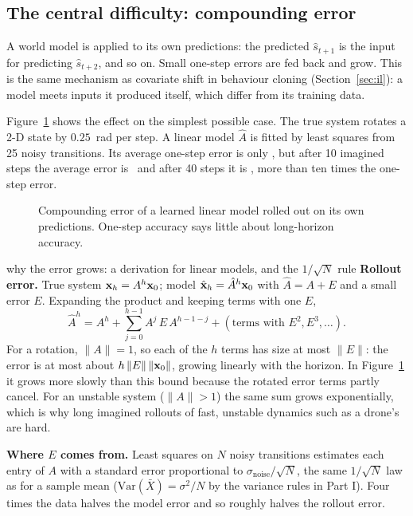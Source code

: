 \subsection{The central difficulty: compounding error}
\label{sec:compound}
A world model is applied to its own predictions: the predicted $\hat s_{t+1}$ is the input for predicting $\hat s_{t+2}$, and so on. Small one-step errors are fed back and grow. This is the same mechanism as covariate shift in behaviour cloning (Section~\ref{sec:il}): a model meets inputs it produced itself, which differ from its training data.

Figure~\ref{fig:compound} shows the effect on the simplest possible case. The true system rotates a 2-D state by $0.25$~rad per step. A linear model $\hat A$ is fitted by least squares from 25 noisy transitions. Its average one-step error is only \onestep, but after 10 imagined steps the average error is \errten\ and after 40 steps it is \errforty, more than ten times the one-step error.

\begin{figure}[h]
\centering
{}
\caption{Compounding error of a learned linear model rolled out on its own predictions. One-step accuracy says little about long-horizon accuracy.}
\label{fig:compound}
\end{figure}

\begin{probbox}{why the error grows: a derivation for linear models, and the $1/\sqrt N$ rule}
\textbf{Rollout error.} True system $\mathbf{x}_{h}=A^h\mathbf{x}_0$; model $\hat{\mathbf{x}}_h=\hat A^h\mathbf{x}_0$ with $\hat A=A+E$ and a small error $E$. Expanding the product and keeping terms with one $E$,
\[
\hat A^h=A^h+\sum_{j=0}^{h-1}A^{j}\,E\,A^{h-1-j}+(\text{terms with }E^2,E^3,\dots).
\]
For a rotation, $\lVert A\rVert=1$, so each of the $h$ terms has size at most $\lVert E\rVert$: the error is at most about $h\,\lVert E\rVert\,\lVert\mathbf{x}_0\rVert$, growing linearly with the horizon. In Figure~\ref{fig:compound} it grows more slowly than this bound because the rotated error terms partly cancel. For an unstable system ($\lVert A\rVert>1$) the same sum grows exponentially, which is why long imagined rollouts of fast, unstable dynamics such as a drone's are hard.

\textbf{Where $E$ comes from.} Least squares on $N$ noisy transitions estimates each entry of $A$ with a standard error proportional to $\sigma_{\text{noise}}/\sqrt N$, the same $1/\sqrt N$ law as for a sample mean ($\mathrm{Var}(\bar X)=\sigma^2/N$ by the variance rules in Part I). Four times the data halves the model error and so roughly halves the rollout error.
\end{probbox}

